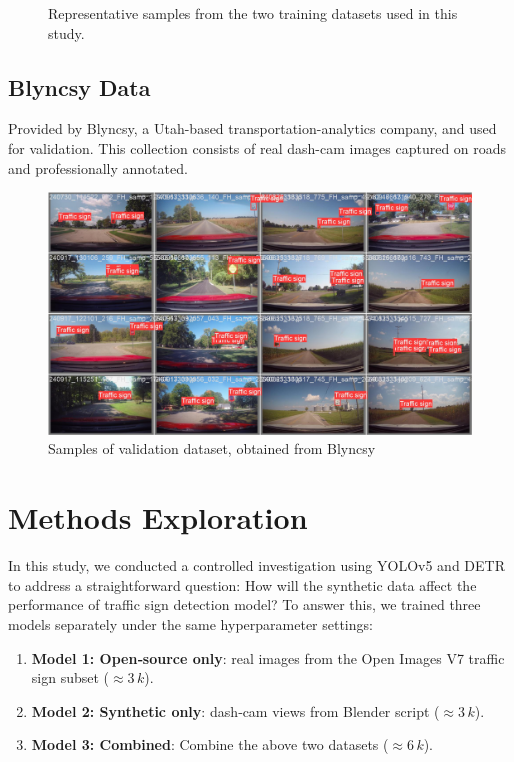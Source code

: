 \documentclass[journal]{IEEEtran}
\begin{document}
\begin{figure}[h]
    \caption{Representative samples from the two training datasets used in this study.}
    \label{fig:datasets_overview}
\end{figure}

\subsection{Blyncsy Data}
Provided by Blyncsy, a Utah-based transportation-analytics company, and used for validation. This collection consists of real dash-cam images captured on roads and professionally annotated.

\begin{figure}[h]
    \centering
    \includegraphics[width=\linewidth]{images/dashcam.jpg}
    \caption{Samples of validation dataset, obtained from Blyncsy}
    \label{fig:row_of_images}
\end{figure}

\section{Methods Exploration}


In this study, we conducted a controlled investigation using YOLOv5 and DETR to address a straightforward question: How will the synthetic data affect the performance of traffic sign detection model? To answer this, we trained three models separately under the same hyperparameter settings:

\begin{enumerate}
  \item \textbf{Model 1: Open‑source only}: real images from the Open Images V7 traffic sign subset ($\approx3\,k$).
  \item \textbf{Model 2: Synthetic only}: dash‑cam views from Blender script ($\approx3\,k$).
  \item \textbf{Model 3: Combined}: Combine the above two datasets ($\approx6\,k$).
\end{enumerate}
\end{document}
